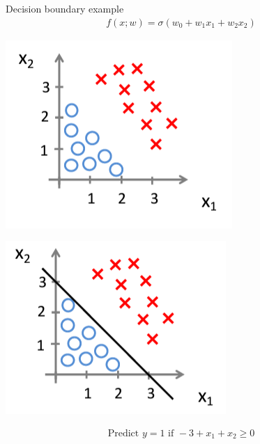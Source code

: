 \documentclass[serif, aspectratio=169]{beamer}
\begin{document}
\begin{frame}{Decision boundary example}
    \begin{align*}
        f(x;w) = \sigma (w_0 + w_1 x_1 + w_2 x_2)
    \end{align*}
    
    \begin{minipage}{0.35\linewidth}
        \centering
        \includegraphics[width=\linewidth]{pic/lrDB1.png}
    \end{minipage}
    \hfill
    \begin{minipage}{0.35\linewidth}
        \centering
        \includegraphics[width=\linewidth]{pic/lrDB2.png}
    \end{minipage}
    
    \begin{align*}
        \text{Predict } y=1 \text{ if } -3 + x_1 + x_2 \geq 0
    \end{align*}
    
\end{frame}
\end{document}
